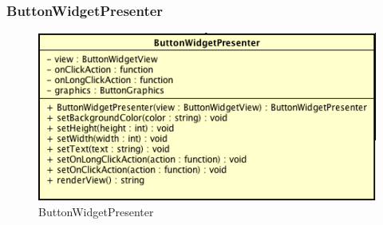 \subsubsection{ButtonWidgetPresenter}

\label{ButtonWidgetPresenter}
\begin{figure}[ht]
	\centering
	\includegraphics[scale=0.5]{Sezioni/SottosezioniST/img/ButtonWidgetPresenter.png}
	\caption{ButtonWidgetPresenter}
\end{figure}

